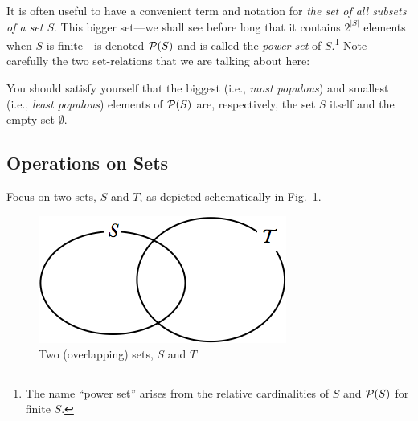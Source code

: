 \smallskip

It is often useful to have a convenient term and notation for {\em the set of all subsets of a set $S$}.  This bigger set---we shall see before long that it contains $2^{|S|}$ elements when $S$ is finite---is denoted $\mbox{$\cal P$}(S)$ and is called the {\em power set} of $S$.\footnote{The name ``power set'' arises from the relative cardinalities of $S$ and ${\cal P}(S)$ for finite $S$.}  Note carefully the two set-relations that we are talking about here: 

\smallskip


\smallskip

\noindent
You should satisfy yourself that the biggest (i.e., {\em most populous}) and smallest (i.e., {\em least populous}) elements of $\mbox{$\cal P$}(S)$ are, respectively, the set $S$ itself and the empty set $\emptyset$.

\subsection{Operations on Sets}
\label{sec:operations-on-sets}

 
Focus on two sets, $S$ and $T$, as depicted schematically in Fig.~\ref{fig:setInitial}.\begin{figure}[htb]
\begin{center}
        \includegraphics[scale=0.4]{FiguresMaths/setInitial}
        \caption{Two (overlapping) sets, $S$ and $T$}
        \label{fig:setInitial}
\end{center}
\end{figure}

\bigskip

 

\noindent {}


